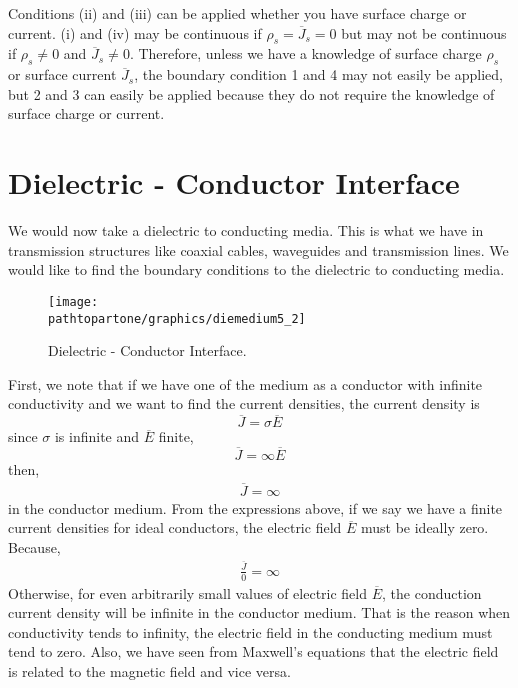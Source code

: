 Conditions (ii) and (iii) can be applied whether you have surface charge or current. (i) and (iv) may be continuous if $\rho_s = \overline{J}_s = 0$ but may not be continuous if $\rho_s\neq 0$ and $\overline{J}_s\neq 0$.
Therefore, unless we have a knowledge of surface charge $\rho_s$ or surface current $\overline{J}_s$, the boundary condition 1 and 4 may not easily be applied, but 2 and 3 can easily be applied because they do not require the knowledge of surface charge or current.

\section{Dielectric - Conductor Interface}
We would now take a dielectric to conducting media. This is what we have in transmission structures like coaxial cables, waveguides and transmission lines. We would like to find the boundary conditions to the dielectric to conducting media. 
\begin{figure}[h]
\centering
\texttt{[image: \\pathtopartone/graphics/diemedium5\_2]}
\caption{Dielectric - Conductor Interface.}
\end{figure}

First, we note that if we have one of the medium as a  conductor with infinite conductivity and we want to find the current densities, the current density is 
\begin{equation}
\overline{J} = \sigma\overline{E}
\end{equation}
since $\sigma$ is infinite and $\overline{E}$ finite,
\begin{equation*}
\overline{J} = \infty\overline{E}
\end{equation*} 
then,
\begin{align*}
\overline{J} = \infty
\end{align*}
in the conductor medium. From the expressions above, if we say we have a finite current densities for ideal conductors, the electric field $\overline{E}$ must be ideally zero. Because,
\begin{align*}
\frac{\overline{J}}{0} = \infty
\end{align*}
Otherwise, for even arbitrarily small values of electric field $\overline{E}$, the conduction current density will be infinite in the conductor medium. That is the reason when conductivity tends to infinity, the electric field in the conducting medium must tend to zero. Also, we have seen from Maxwell's equations that the electric field is related to the magnetic field and vice versa. 

